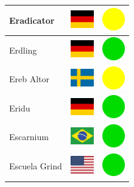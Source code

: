 \documentclass[12pt, a4paper, twoside]{report}
\begin{document}
\begin{center}
\begin{longtable}{|p{5cm}|p{2cm}|p{2cm}|}
 Eradicator                                                 & \includegraphics[width=1cm]{../4x3/de} &   \includegraphics[width=1cm]{../likes/m} \\ \hline
 Erdling                                                    & \includegraphics[width=1cm]{../4x3/de} &   \includegraphics[width=1cm]{../likes/y} \\ \hline
 Ereb Altor                                                 & \includegraphics[width=1cm]{../4x3/se} &   \includegraphics[width=1cm]{../likes/m} \\ \hline
 Eridu                                                      & \includegraphics[width=1cm]{../4x3/de} &   \includegraphics[width=1cm]{../likes/y} \\ \hline
 Escarnium                                                  & \includegraphics[width=1cm]{../4x3/br} &   \includegraphics[width=1cm]{../likes/y} \\ \hline
 Escuela Grind                                              & \includegraphics[width=1cm]{../4x3/us} &   \includegraphics[width=1cm]{../likes/y} \\ \hline

\end{longtable}
\end{center}
\end{document}
